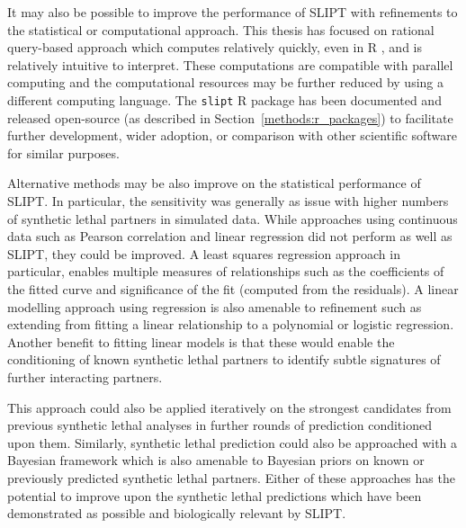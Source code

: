It may also be possible to improve the performance of \gls{SLIPT} with refinements to the statistical or computational approach. This thesis has focused on rational query-based approach which computes relatively quickly, even in R \citep{R_core}, and is relatively intuitive to interpret. These computations are compatible with parallel computing and the computational resources may be further reduced by using a different computing language. The \texttt{slipt} R package has been documented and released open-source (as described in Section~\ref{methods:r_packages}) to facilitate further development, wider adoption, or comparison with other scientific software for similar purposes. 

Alternative methods may be also improve on the statistical performance of \gls{SLIPT}. In particular, the sensitivity was generally as issue with higher numbers of \gls{synthetic lethal} partners in simulated data. While approaches using continuous data such as Pearson correlation and linear regression did not perform as well as \gls{SLIPT}, they could be improved. A least squares regression approach in particular, enables multiple measures of relationships such as the coefficients of the fitted curve and significance of the fit (computed from the residuals). A linear modelling approach using regression is also amenable to refinement such as extending from fitting a linear relationship to a polynomial or logistic regression. Another benefit to fitting linear models is that these would enable the conditioning of known \gls{synthetic lethal} partners to identify subtle signatures of further interacting partners.

This approach could also be applied iteratively on the strongest candidates from previous \gls{synthetic lethal} analyses in further rounds of prediction conditioned upon them. Similarly, \gls{synthetic lethal} prediction could also be approached with a Bayesian framework which is also amenable to Bayesian priors on known or previously predicted \gls{synthetic lethal} partners. Either of these approaches has the potential to improve upon the \gls{synthetic lethal} predictions which have been demonstrated as possible and biologically relevant by \gls{SLIPT}. 